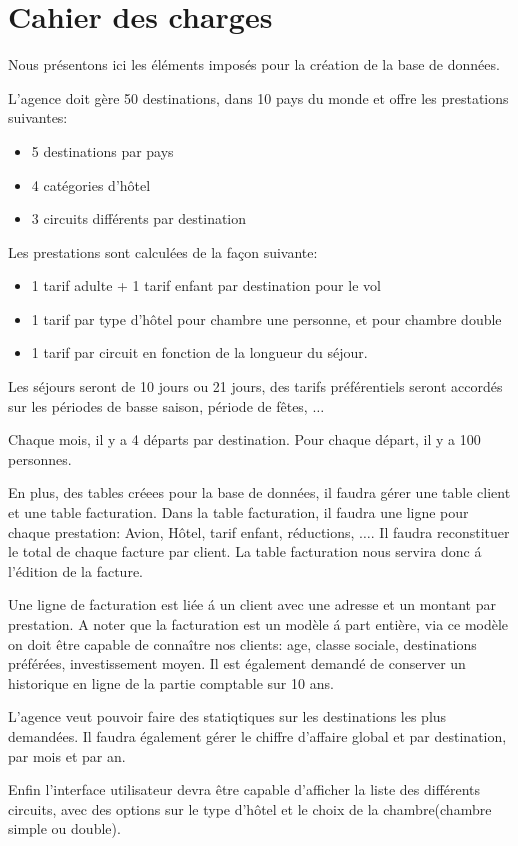 \section{Cahier des charges}
Nous pr\'esentons ici les \'el\'ements impos\'es pour la cr\'eation de la base de donn\'ees.

L'agence doit g\`ere 50 destinations, dans 10 pays du monde et offre les prestations suivantes:
\begin{itemize}
\item 5 destinations par pays
\item 4 cat\'egories d'h\^otel
\item 3 circuits diff\'erents par destination
\end{itemize}

Les prestations sont calcul\'ees de la fa\c{c}on suivante:
\begin{itemize}
\item 1 tarif adulte + 1 tarif enfant par destination pour le vol
\item 1 tarif par type d'h\^otel pour chambre une personne, et pour chambre double
\item 1 tarif par circuit en fonction de la longueur du s\'ejour.
\end{itemize}

Les s\'ejours seront de 10 jours ou 21 jours, des tarifs pr\'ef\'erentiels seront accord\'es sur les p\'eriodes de basse saison, p\'eriode de f\^etes, $\ldots$

Chaque mois, il y a 4 d\'eparts par destination. Pour chaque d\'epart, il y a 100 personnes.

En plus, des tables cr\'eees pour la base de donn\'ees, il faudra g\'erer une table client et une table facturation. Dans la table facturation, il faudra une ligne pour chaque prestation: Avion, H\^otel, tarif enfant, r\'eductions, $\ldots$. Il faudra reconstituer le total de chaque facture par client. La table facturation nous servira donc \'a l'\'edition de la facture.

Une ligne de facturation est li\'ee \'a un client avec une adresse et un montant par prestation. A noter que la	facturation est un mod\`ele \'a part enti\`ere, via ce mod\`ele on doit \^etre capable de conna\^itre nos clients: age, classe sociale, destinations pr\'ef\'er\'ees, investissement moyen. Il est \'egalement demand\'e de conserver un historique en ligne de la partie comptable sur 10 ans.

L'agence veut pouvoir faire des statiqtiques sur les destinations les plus demand\'ees. Il faudra \'egalement g\'erer le chiffre d'affaire global et par destination, par mois et par an.

Enfin l'interface utilisateur devra \^etre capable d'afficher la liste des diff\'erents circuits, avec des options sur le type d'h\^otel et le choix de la chambre(chambre simple ou double).

